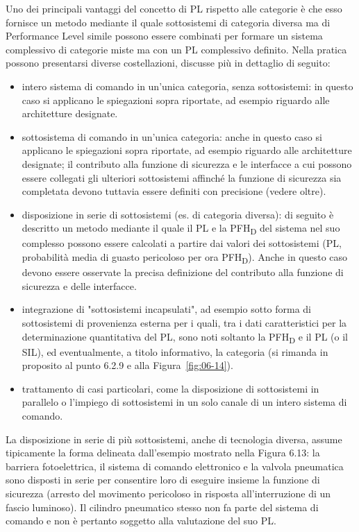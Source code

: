Uno dei principali vantaggi del concetto di PL rispetto alle categorie è che esso fornisce un metodo mediante il quale sottosistemi di categoria diversa ma di Performance Level simile possono essere combinati per formare un sistema complessivo di categorie miste ma con un PL complessivo definito. Nella pratica possono presentarsi diverse costellazioni, discusse più in dettaglio di seguito:
\begin{itemize}
    \item intero sistema di comando in un'unica categoria, senza sottosistemi: in questo caso si applicano le spiegazioni sopra riportate, ad esempio riguardo alle architetture designate.
    \item sottosistema di comando in un'unica categoria: anche in questo caso si applicano le spiegazioni sopra riportate, ad esempio riguardo alle architetture designate; il contributo alla funzione di sicurezza e le interfacce a cui possono essere collegati gli ulteriori sottosistemi affinché la funzione di sicurezza sia completata devono tuttavia essere definiti con precisione (vedere oltre).
    \item disposizione in serie di sottosistemi (es. di categoria diversa): di seguito è descritto un metodo mediante il quale il PL e la PFH\textsubscript{D} del sistema nel suo complesso possono essere calcolati a partire dai valori dei sottosistemi (PL, probabilità media di guasto pericoloso per ora PFH\textsubscript{D}). Anche in questo caso devono essere osservate la precisa definizione del contributo alla funzione di sicurezza e delle interfacce.
    \item integrazione di "sottosistemi incapsulati", ad esempio sotto forma di sottosistemi di provenienza esterna per i quali, tra i dati caratteristici per la determinazione quantitativa del PL, sono noti soltanto la PFH\textsubscript{D} e il PL (o il SIL), ed eventualmente, a titolo informativo, la categoria (si rimanda in proposito al punto 6.2.9 e alla Figura~\ref{fig:06-14}).
    \item trattamento di casi particolari, come la disposizione di sottosistemi in parallelo o l'impiego di sottosistemi in un solo canale di un intero sistema di comando.
\end{itemize}

La disposizione in serie di più sottosistemi, anche di tecnologia diversa, assume tipicamente la forma delineata dall'esempio mostrato nella Figura 6.13: la barriera fotoelettrica, il sistema di comando elettronico e la valvola pneumatica sono disposti in serie per consentire loro di eseguire insieme la funzione di sicurezza (arresto del movimento pericoloso in risposta all'interruzione di un fascio luminoso). Il cilindro pneumatico stesso non fa parte del sistema di comando e non è pertanto soggetto alla valutazione del suo PL.

